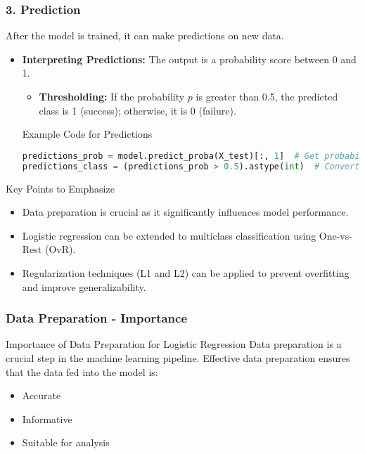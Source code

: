 \documentclass[aspectratio=169]{beamer}
\begin{document}
\begin{frame}[fragile]
  \frametitle{3. Prediction}
  After the model is trained, it can make predictions on new data.
  
  \begin{itemize}
    \item \textbf{Interpreting Predictions:} The output is a probability score between 0 and 1.
    \begin{itemize}
      \item \textbf{Thresholding:} If the probability \( p \) is greater than 0.5, the predicted class is 1 (success); otherwise, it is 0 (failure).
    \end{itemize}
    
    \begin{block}{Example Code for Predictions}
    \begin{lstlisting}[language=Python]
predictions_prob = model.predict_proba(X_test)[:, 1]  # Get probabilities
predictions_class = (predictions_prob > 0.5).astype(int)  # Convert to binary
    \end{lstlisting}
    \end{block}
  \end{itemize}

  \begin{block}{Key Points to Emphasize}
    \begin{itemize}
      \item Data preparation is crucial as it significantly influences model performance.
      \item Logistic regression can be extended to multiclass classification using One-vs-Rest (OvR).
      \item Regularization techniques (L1 and L2) can be applied to prevent overfitting and improve generalizability.
    \end{itemize}
  \end{block}
\end{frame}

\begin{frame}[fragile]
    \frametitle{Data Preparation - Importance}
    \begin{block}{Importance of Data Preparation for Logistic Regression}
        Data preparation is a crucial step in the machine learning pipeline. 
        Effective data preparation ensures that the data fed into the model is:
        \begin{itemize}
            \item Accurate
            \item Informative
            \item Suitable for analysis
        \end{itemize}
    \end{block}
\end{frame}
\end{document}
